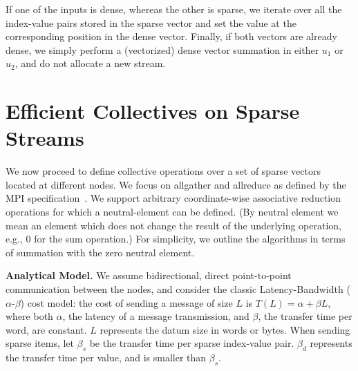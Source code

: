 \documentclass[11pt]{article}
\renewcommand{\paragraph}[1]{\vspace{0.1em} \noindent \textbf{#1}}
\begin{document}
If one of the inputs is dense, whereas the other is sparse, we
iterate over all the index-value pairs stored in the sparse vector and
set the value at the corresponding position in the dense vector. Finally, if both vectors are already dense, we simply perform a (vectorized) dense vector summation in either $u_1$ or $u_2$, and do not allocate a new stream. 

\section{Efficient Collectives on Sparse Streams}

We now proceed to define collective operations over a set of sparse
vectors located at different nodes. We focus on allgather
and allreduce as defined by the MPI
specification~\cite{UsingAdvancedMPI}. We support arbitrary
coordinate-wise associative reduction operations for which a
neutral-element can be defined. (By neutral element we mean an element
which does not change the result of the underlying operation, e.g., $0$ for the sum operation.) For simplicity, we outline the
algorithms in terms of summation with the zero neutral element.

\paragraph{Analytical Model.}
\label{subsec:Assumptions}
We assume bidirectional, direct point-to-point communication between the
nodes, and consider the classic Latency-Bandwidth ($\alpha$-$\beta$) cost model: the cost of
sending a message of size $L$ is $T(L) = \alpha + \beta L$,
where both $\alpha$, the latency of a message transmission, and
$\beta$, the transfer time per word, are constant. $L$ represents the
datum size in words or bytes. When sending sparse items, let 
$\beta_s$ be the transfer time per sparse index-value pair. $\beta_d$
represents the transfer time per value, and is smaller than $\beta_s$.
\end{document}
